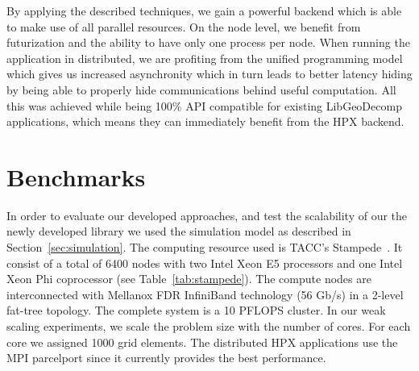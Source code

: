\documentclass{sig-alternate}
\newcommand{\upp}{\vspace*{-0.5em}}
\newcommand{\up}{\vspace*{-0.25em}}
\begin{document}
By applying the described techniques, we gain a powerful backend which is able to
make use of all parallel resources. On the node level, we benefit from futurization
and the ability to have only one process per node. When running the application in
distributed, we are profiting from the unified programming model which gives us
increased asynchronity which in turn leads to better latency hiding by being able
to properly hide communications behind useful computation. All this was achieved
while being 100\% API compatible for existing LibGeoDecomp applications, which means they
can immediately benefit from the HPX backend.

\section{Benchmarks}
\label{sec:benchmarks}

In order to evaluate our developed approaches, and test the scalability of our
the newly developed library we used the simulation model as described in
Section~\ref{sec:simulation}. The computing resource used is TACC's
Stampede~\cite{stampede_tacc}. It consist of a total of 6400 nodes with two Intel Xeon
E5 processors and one Intel Xeon Phi coprocessor (see Table~\ref{tab:stampede}).
The compute nodes are interconnected with Mellanox FDR InfiniBand technology
(56 Gb/s) in a 2-level fat-tree topology. The complete system is a 10 PFLOPS
cluster. In our weak scaling experiments, we scale the problem size with the number of cores.
For each core we assigned 1000 grid elements. The distributed HPX
applications use the MPI parcelport since it currently provides the best
performance.
\end{document}
